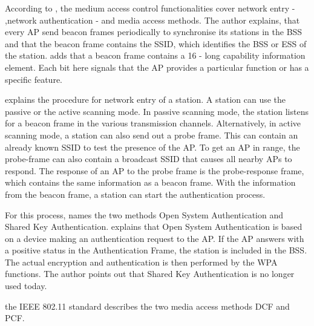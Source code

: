 \documentclass[]{nsm-thesis}
\begin{document}
According to \textcite{kauffels_wireless_2002}, the medium access control functionalities cover network entry - ,network authentication - and media access methods.
The author explains, that every \ac{AP} send beacon frames periodically to synchronise its stations in the \ac{BSS} and that the beacon frame contains the \ac{SSID}, which identifies the \ac{BSS} or \ac{ESS} of the station. \textcite{sauter_wireless_2022} adds that a beacon frame contains a \SI{16}{\bit} - long capability information element. Each bit here signals that the \ac{AP} provides a particular function or has a specific feature. 

\textcite{kauffels_wireless_2002} explains the procedure for network entry of a station. A station can use the passive or the active scanning mode. In passive scanning mode, the station listens for a beacon frame in the various transmission channels. Alternatively, in active scanning mode, a station can also send out a probe frame. This can contain an already known \ac{SSID} to test the presence of the \ac{AP}. To get an \ac{AP} in range, the probe-frame can also contain a broadcast SSID that causes all nearby \ac{AP}s to respond. The response of an \ac{AP} to the probe frame is the probe-response frame, which contains the same information as a beacon frame. With the information from the beacon frame, a station can start the authentication process.
 
For this process, \textcite{kauffels_wireless_2002} names the two methods Open System Authentication and Shared Key Authentication. \textcite{sauter_wireless_2022} explains that Open System Authentication is based on a device making an authentication request to the \ac{AP}. If the \ac{AP} answers with a positive status in the Authentication Frame, the station is included in the \ac{BSS}. The actual encryption and authentication is then performed by the \ac{WPA} functions. The author points out that Shared Key Authentication is no longer used today. 

 the IEEE 802.11 standard describes the two media access methods \ac{DCF} and \ac{PCF}.
\end{document}
